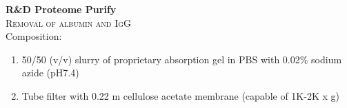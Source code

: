 \textbf{R&D Proteome Purify} 
\\
\textsc{Removal of albumin and IgG}
\\
Composition: 
\begin{enumerate}
\item{50/50 (v/v) slurry of proprietary absorption gel in PBS with 0.02\% sodium azide (pH7.4)}
\item{Tube filter with 0.22 \mu m cellulose acetate membrane (capable of 1K-2K x g)}
\end{enumerate}


